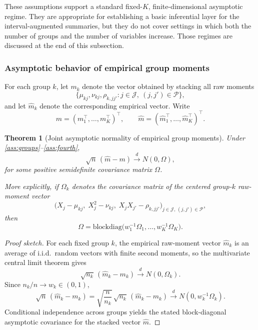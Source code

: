 \documentclass[preprint, times, 12pt, authoryear]{elsarticle}
\newtheorem{theorem}{Theorem}
\begin{document}
These assumptions support a standard fixed-\(K\), finite-dimensional asymptotic regime. They are appropriate for establishing a basic inferential layer for the interval-augmented summaries, but they do not cover settings in which both the number of groups and the number of variables increase. Those regimes are discussed at the end of this subsection.

\subsubsection{Asymptotic behavior of empirical group moments}

For each group $k$, let $m_k$ denote the vector obtained by stacking all raw moments
\[
\{\mu_{kj},\nu_{kj},\rho_{k,jj'}: j\in\mathcal J,\ (j,j')\in\mathcal P\},
\]
and let $\hat m_k$ denote the corresponding empirical vector. Write
\[
m=(m_1^\top,\ldots,m_K^\top)^\top,
\qquad
\hat m=(\hat m_1^\top,\ldots,\hat m_K^\top)^\top.
\]

\begin{theorem}[Joint asymptotic normality of empirical group moments]\label{thm:joint_clt}
	Under \ref{ass:groups}--\ref{ass:fourth},
	\[
	\sqrt{n}\,(\hat m-m)\xrightarrow{d}N(0,\Omega),
	\]
	for some positive semidefinite covariance matrix $\Omega$.
	
	More explicitly, if $\Omega_k$ denotes the covariance matrix of the centered group-$k$ raw-moment vector
	\[
	\Big(X_j-\mu_{kj},\;X_j^2-\nu_{kj},\;X_jX_{j'}-\rho_{k,jj'}\Big)_{j\in\mathcal J,\,(j,j')\in\mathcal P},
	\]
	then
	\[
	\Omega=\mathrm{blockdiag}\!\big(w_1^{-1}\Omega_1,\ldots,w_K^{-1}\Omega_K\big).
	\]
\end{theorem}

\begin{proof}[Proof sketch]
	For each fixed group $k$, the empirical raw-moment vector $\hat m_k$ is an average of i.i.d.\ random vectors with finite second moments, so the multivariate central limit theorem gives
	\[
	\sqrt{n_k}\,(\hat m_k-m_k)\xrightarrow{d}N(0,\Omega_k).
	\]
	Since $n_k/n\to w_k\in(0,1)$,
	\[
	\sqrt{n}\,(\hat m_k-m_k)
	=
	\sqrt{\frac{n}{n_k}}\,
	\sqrt{n_k}\,(\hat m_k-m_k)
	\xrightarrow{d}
	N(0,w_k^{-1}\Omega_k).
	\]
	Conditional independence across groups yields the stated block-diagonal asymptotic covariance for the stacked vector $\hat m$.
\end{proof}

\end{document}
